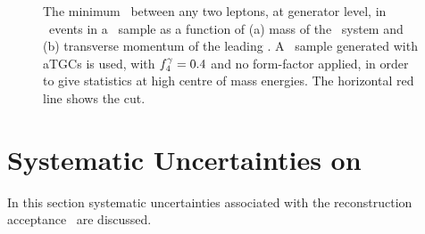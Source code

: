 \begin{figure}[h]
\centering
    \caption[Effect of the  requirement on sensitivity to boosted
    \fourlep\ systems.]{The minimum \deltaR\ between any two leptons, at
    generator level, in \fourlep\
    events in a \mc\ sample as a function of (a) mass of the
    \fourlep\ system and (b) transverse momentum of the leading \Z. A \ZZllll\
    sample generated with aTGCs is used, with $f_{4}^{\gamma}=0.4$ and no form-factor
    applied, in order to give statistics at high centre
    of mass energies. The
    horizontal red line shows the \deltaRlt{0.2} cut. }
\label{fig:objSel-deltaRcutoff} 
\end{figure}

\section{Systematic Uncertainties on \CZZ}

In this section systematic uncertainties associated with the reconstruction
acceptance \CZZ\ are discussed. %

